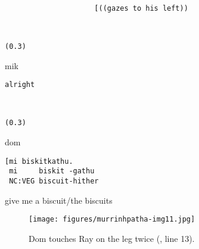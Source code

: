 \documentclass[output=paper,nonflat,colorlinks,citecolor=brown]{langsci/langscibook}
\begin{document}
%
\begin{transbox}{8}{~}
\begin{verbatim}
                     [((gazes to his left))
\end{verbatim}
\end{transbox}\vspace{-1mm}
%
\begin{transbox}{9}{~}
\begin{verbatim}
(0.3)
\end{verbatim}
\end{transbox}
%
\begin{transbox}{10}{mik}
\begin{verbatim}
alright
\end{verbatim}
\end{transbox}
%
\begin{transbox}{11}{~}
\begin{verbatim}
(0.3)
\end{verbatim}
\end{transbox}
%
\begin{transbox}{12}{dom}
\begin{verbatim}
[mi biskitkathu.
 mi     biskit -gathu
 NC:VEG biscuit-hither
\end{verbatim}
\hspace{0.07cm} give me a biscuit/the biscuits
\end{transbox}
%
\xtransbox{13}{~}{[((touches Ray's leg twice, Figure 11))} %
%

\begin{figure}
\texttt{[image: figures/murrinhpatha-img11.jpg]}
\caption{
Dom touches Ray on the leg twice (, line 13).
\label{fig:blythe:11}}\end{figure}
\end{document}
